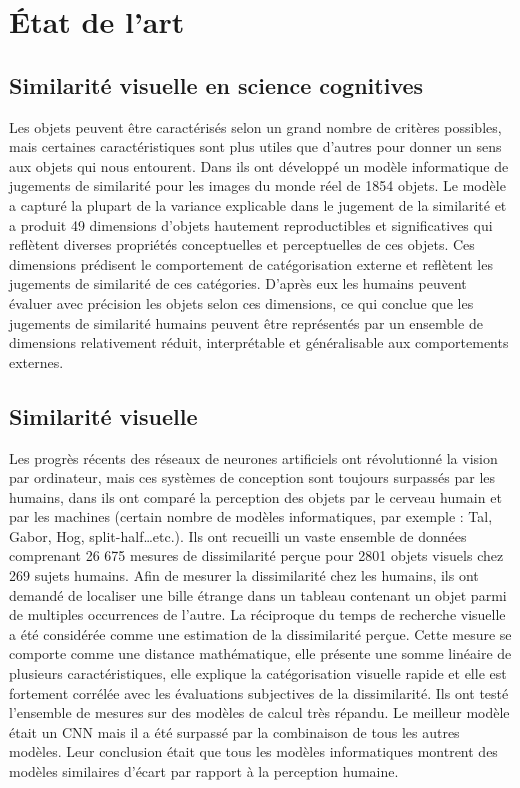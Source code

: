\chapter{État de l'art}


\section{Similarité visuelle en science cognitives}

Les objets peuvent être caractérisés selon un grand nombre de critères possibles, mais certaines caractéristiques sont plus utiles que d'autres pour donner un sens aux objets qui nous entourent. Dans \cite{hebart2020revealing} ils ont développé un modèle informatique de jugements de similarité pour les images du monde réel de 1854 objets. Le modèle a capturé la plupart de la variance explicable dans le jugement de la similarité et a produit 49 dimensions d'objets hautement reproductibles et significatives qui reflètent diverses propriétés conceptuelles et perceptuelles de ces objets. Ces dimensions prédisent le comportement de catégorisation externe et reflètent les jugements de similarité de ces catégories. D'après eux les humains peuvent évaluer avec précision les objets selon ces dimensions, ce qui conclue que les jugements de similarité humains peuvent être représentés par un ensemble de dimensions relativement réduit, interprétable et généralisable aux comportements externes. 

\section{Similarité visuelle}

Les progrès récents des réseaux de neurones artificiels ont révolutionné la vision par ordinateur, mais ces systèmes de conception sont toujours surpassés par les humains, dans \cite{pramod2016computational} ils ont comparé la perception des objets par le cerveau humain et par les machines (certain nombre de modèles informatiques, par exemple : Tal, Gabor, Hog, split-half…etc.).  Ils ont recueilli un vaste ensemble de données comprenant 26 675 mesures de dissimilarité perçue pour 2801 objets visuels chez 269 sujets humains.  Afin de mesurer la dissimilarité chez les humains, ils ont demandé de localiser une bille étrange dans un tableau contenant un objet parmi de multiples occurrences de l'autre. La réciproque du temps de recherche visuelle a été considérée comme une estimation de la dissimilarité perçue. Cette mesure se comporte comme une distance mathématique, elle présente une somme linéaire de plusieurs caractéristiques, elle explique la catégorisation visuelle rapide et elle est fortement corrélée avec les évaluations subjectives de la dissimilarité. Ils ont testé l'ensemble de mesures sur des modèles de calcul très répandu. Le meilleur modèle était un CNN mais il a été surpassé par la combinaison de tous les autres modèles. Leur conclusion était que tous les modèles informatiques montrent des modèles similaires d'écart par rapport à la perception humaine.


